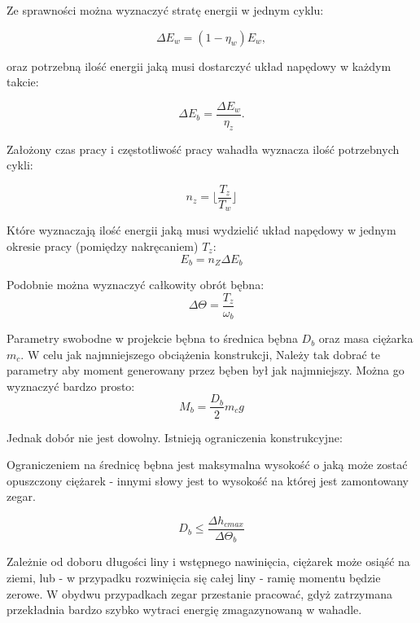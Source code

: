 Ze sprawności można wyznaczyć stratę energii w jednym cyklu:

\begin{equation}
\Delta E_w = (1-\eta_w)E_w,
\end{equation}

oraz potrzebną ilość energii jaką musi dostarczyć układ napędowy w każdym takcie:

\begin{equation}
\Delta E_b = \frac{\Delta E_w}{\eta_z}.
\end{equation}

Założony czas pracy i częstotliwość pracy wahadła wyznacza ilość potrzebnych cykli:

\begin{equation}
n_z = \lfloor\frac{T_z}{T_w}\rfloor
\end{equation}

Które wyznaczają ilość energii jaką musi wydzielić układ napędowy w jednym okresie pracy (pomiędzy nakręcaniem) \(T_z\):
\begin{equation}
E_b = n_Z \Delta E_b
\end{equation}

Podobnie można wyznaczyć całkowity obrót bębna:
\begin{equation}
\Delta \Theta = \frac{T_z}{\omega_b}
\end{equation}

Parametry swobodne w projekcie bębna to średnica bębna \(D_b\) oraz masa ciężarka \(m_c\). W celu jak najmniejszego obciążenia konstrukcji, Należy tak dobrać te parametry aby moment generowany przez bęben był jak najmniejszy. Można go wyznaczyć bardzo prosto:
\begin{equation}
M_b = \frac{D_b}{2}m_c g
\end{equation}

Jednak dobór nie jest dowolny. Istnieją ograniczenia konstrukcyjne:

Ograniczeniem na średnicę bębna jest maksymalna wysokość o jaką może zostać opuszczony ciężarek - innymi słowy jest to wysokość na której jest zamontowany zegar.

\begin{equation}
\label{eqn:Dbbound}
D_b \leq \frac{\Delta h_{cmax}}{\Delta \Theta_b}
\end{equation}

Zależnie od doboru długości liny i wstępnego nawinięcia, ciężarek może osiąść na ziemi, lub - w przypadku rozwinięcia się całej liny - ramię momentu będzie zerowe. W obydwu przypadkach zegar przestanie pracować, gdyż zatrzymana przekładnia bardzo szybko wytraci energię zmagazynowaną w wahadle.


